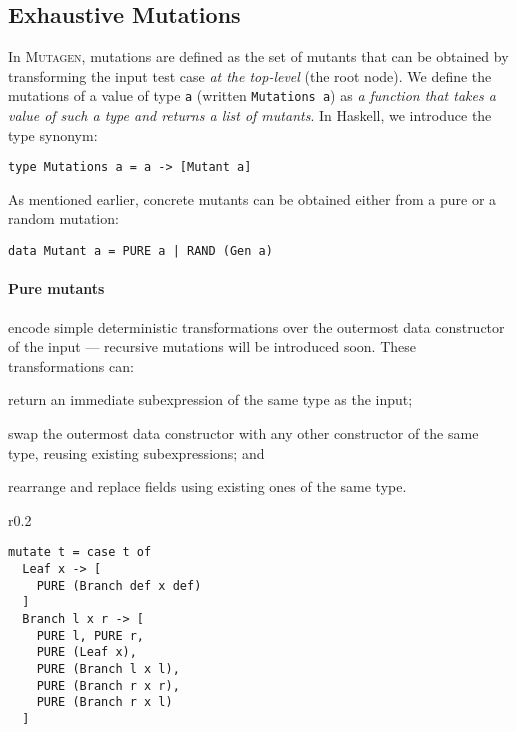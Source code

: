 \documentclass[sigconf,review,anonymous]{acmart}
\newcommand{\fuzzchick}{\textit{FuzzChick}\xspace}
\newcommand{\mutagen}{\textsc{Mutagen}\xspace}
\begin{document}
\subsection{Exhaustive Mutations}


In \mutagen, mutations are defined as the set of mutants that can be obtained by
transforming the input test case \emph{at the top-level} (the root node).
%
We define the mutations of a value of type \texttt{a} (written \texttt{Mutations
  a}) as \emph{a function that takes a value of such a type and returns a list
  of mutants}.
%
In Haskell, we introduce the type synonym:
%
\begin{verbatim}
type Mutations a = a -> [Mutant a]
\end{verbatim}
%
\noindent As mentioned earlier, concrete mutants can be obtained either from a
pure or a random mutation:

\begin{verbatim}
data Mutant a = PURE a | RAND (Gen a)
\end{verbatim}

\paragraph{Pure mutants} 
%
encode simple deterministic transformations over the outermost data constructor
of the input --- recursive mutations will be introduced soon.
%
These transformations can:
%
\begin{inparaenum}
\item return an immediate subexpression of the same type as the input;
\item swap the outermost data constructor with any other constructor of the
  same type, reusing existing subexpressions; and
\item rearrange and replace fields using existing ones of the same type.
\end{inparaenum}


\setlength{\intextsep}{10pt}%
\setlength{\columnsep}{10pt}%
\begin{wrapfigure}{r}{0.2\textwidth}
\vspace{-10pt}
\begin{verbatim}
mutate t = case t of 
  Leaf x -> [ 
    PURE (Branch def x def)
  ]
  Branch l x r -> [ 
    PURE l, PURE r, 
    PURE (Leaf x), 
    PURE (Branch l x l),
    PURE (Branch r x r),
    PURE (Branch r x l)
  ]
\end{verbatim}
\vspace{-10pt}
\caption{\label{fig:mutagen:mutator}\mutagen mutator for the \texttt{Tree} data
  type.}
\vspace{-10pt}
\end{wrapfigure}
\end{document}
